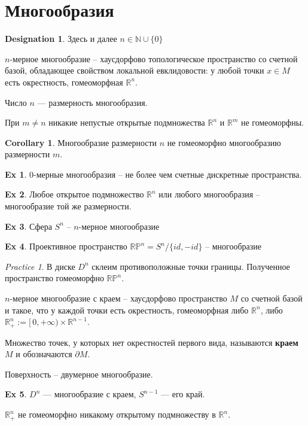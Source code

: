 \documentclass[11pt]{book}
\newcommand{\N}{\mathbb{N}}
\newcommand{\R}{\mathbb{R}}
\newcommand{\Pm}{\mathbb{P}}
\theoremstyle{definition}
\theoremstyle{plain}
\theoremstyle{plain}
\theoremstyle{definition}
\newtheorem*{ex}{Ex}
\newtheorem*{cor}{Corollary}
\newtheorem*{name}{Designation}
\theoremstyle{remark}
\newtheorem*{prac}{Practice}
\begin{document}
\section{Многообразия}
\begin{name}
    Здесь и далее $ n \in \N \cup \{0\}$
\end{name}
\begin{defn}
    $ n$-мерное многообразие -- хаусдорфово топологическое пространство со счетной базой, обладающее свойством локальной евклидовости: у любой точки $ x \in M$ есть окрестность, гомеоморфная  $ \R^{n}$.

    Число $ n$ --- размерность многообразия.
\end{defn}
\begin{thm}
    При $ m \ne n$ никакие непустые открытые подмножества $ \R^{n}$ и $ \R^{m}$ не гомеоморфны.
\end{thm}
\begin{cor}
    Многообразие размерности $ n$ не гомеоморфно многообразию размерности $ m$.
\end{cor}
\begin{ex}
    $ 0$-мерные многообразия -- не более чем счетные дискретные пространства.
\end{ex}
\begin{ex}
    Любое открытое подмножество $ \R^{n}$ или любого многообразия -- многообразие той же размерности.
\end{ex}
\begin{ex}
    Сфера $ S^{n}$ -- $ n$-мерное многообразие
\end{ex}
\begin{ex}
    Проективное пространство $ \R \Pm^{n} = S^{n}/\{id, -id\}$ -- многообразие
\end{ex}
\begin{prac}
    В диске $ D^{n}$ склеим противоположные точки границы. Полученное пространство гомеоморфно $ \R \Pm^{n}$.
\end{prac}
\begin{defn}
    $ n$-мерное многообразие с краем -- хаусдорфово пространство $ M$ со счетной базой и такое, что у каждой точки есть окрестность, гомеоморфная либо  $ \R^{n}$, либо $ \R^{n}_+ := [\,0, +\infty) \times \R^{n-1} $.

    Множество точек, у которых нет окрестностей первого вида, называются {\bf краем} $ M$ и обозначаются $\partial M$.
\end{defn}
\begin{defn}
    Поверхность -- двумерное многообразие.
\end{defn}
\begin{ex}
    $ D^{n}$ --- многообразие с краем, $ S^{n-1}$ --- его край.
\end{ex}
\begin{thm}
    $ \R^{n} _{+}$ не гомеоморфно никакому открытому подмножеству в $ \R^{n} $.
\end{thm}
\end{document}
